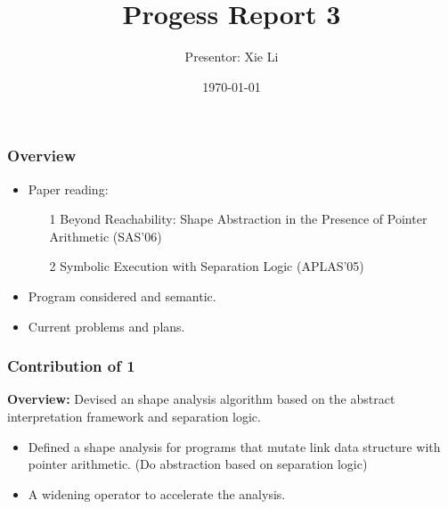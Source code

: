 \documentclass[aspectratio=1610, 13pt]{beamer}
\title{Progess Report 3}
\date{\today}
\author{Presentor: Xie Li}
\begin{document}
\maketitle

\begin{frame}\frametitle{Overview}
\begin{itemize}
\item Paper reading: 
\begin{itemize}
\item [1]Beyond Reachability: Shape Abstraction in the Presence of Pointer Arithmetic (SAS'06)

\item [2]Symbolic Execution with Separation Logic (APLAS'05)
\end{itemize}


\item Program considered and semantic.

\item Current problems and plans.
\end{itemize}
\end{frame}


\begin{frame}\frametitle{Contribution of 1}

\textbf{Overview:} Devised an shape analysis algorithm based on the abstract interpretation framework and separation logic.

\begin{itemize}
\item Defined a shape analysis for programs that mutate link data structure with pointer arithmetic. (Do abstraction based on separation logic)



\item A widening operator to accelerate the analysis.


\end{itemize}


\end{frame}
\end{document}
